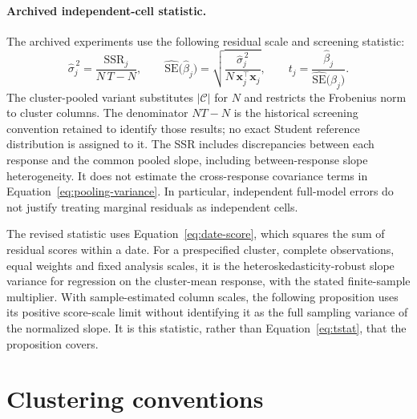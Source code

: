 \documentclass[11pt,a4paper]{article}
\begin{document}
\paragraph{Archived independent-cell statistic.}
The archived experiments use the following residual scale and screening
statistic:
%
\begin{equation} \label{eq:tstat}
	\hat{\sigma}_j^{\,2} = \frac{\mathrm{SSR}_j}{N\, T - N},
	\qquad
	\widehat{\mathrm{SE}}\bigl(\hat{\beta}_j\bigr) =
	\sqrt{\frac{\hat{\sigma}_j^{\,2}}{N\, \bm{x}_j^\top \bm{x}_j}},
	\qquad
	t_j = \frac{\hat{\beta}_j}{\widehat{\mathrm{SE}}\bigl(\hat{\beta}_j\bigr)}.
\end{equation}
%
The cluster-pooled variant substitutes $|\mathcal C|$ for $N$ and restricts the
Frobenius norm to cluster columns. The denominator $NT-N$ is the historical
screening convention retained to identify those results; no exact Student
reference distribution is assigned to it. The SSR includes discrepancies
between each response and the common pooled slope, including between-response
slope heterogeneity. It does not estimate the cross-response covariance terms
in Equation~\eqref{eq:pooling-variance}. In particular, independent full-model
errors do not justify treating marginal residuals as independent cells.

The revised statistic uses Equation~\eqref{eq:date-score}, which squares the
sum of residual scores within a date. For a prespecified cluster, complete
observations, equal weights and fixed analysis scales, it is the
heteroskedasticity-robust slope variance for regression on the cluster-mean
response, with the stated finite-sample multiplier. With sample-estimated
column scales, the following proposition uses its positive score-scale limit
without identifying it as the full sampling variance of the normalized slope.
It is this statistic, rather than Equation~\eqref{eq:tstat}, that the
proposition covers.


\FloatBarrier

\section{Clustering conventions}\label{app:clustering-conventions}
\end{document}
